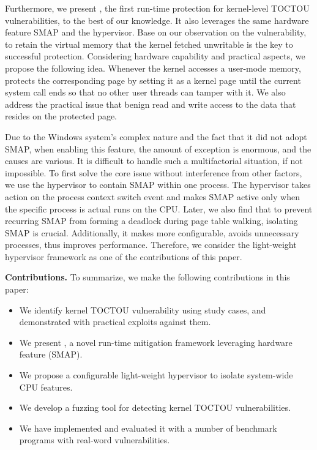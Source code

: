 Furthermore, we present \name, the first run-time protection for kernel-level TOCTOU vulnerabilities, to the best of our knowledge. It also leverages the same hardware feature SMAP and the hypervisor. Base on our observation on the vulnerability, to retain the virtual memory that the kernel fetched unwritable is the key to successful protection. Considering hardware capability and practical aspects, we propose the following idea. Whenever the kernel accesses a user-mode memory, \name protects the corresponding page by setting it as a kernel page until the current system call ends so that no other user threads can tamper with it. We also address the practical issue that benign read and write access to the data that resides on the protected page.


Due to the Windows system's complex nature and the fact that it did not adopt SMAP, when enabling this feature, the amount of exception is enormous, and the causes are various. It is difficult to handle such a multifactorial situation, if not impossible. To first solve the core issue without interference from other factors, we use the hypervisor to contain SMAP within one process. The hypervisor takes action on the process context switch event and makes SMAP active only when the specific process is actual runs on the CPU. Later, we also find that to prevent recurring SMAP from forming a deadlock during page table walking, isolating SMAP is crucial. Additionally, it makes \name more configurable, avoids unnecessary processes, thus improves performance. Therefore, we consider the light-weight hypervisor framework as one of the contributions of this paper. 

\textbf{Contributions.} To summarize, we make the following contributions in this paper:
\begin{itemize}[leftmargin=*]
    \item We identify kernel TOCTOU vulnerability using study cases, and demonstrated with practical exploits against them. 
    \item We present \name, a novel run-time mitigation framework leveraging hardware feature (SMAP). 
    \item We propose a configurable light-weight hypervisor to isolate system-wide CPU features.
    \item We develop a fuzzing tool for detecting kernel TOCTOU vulnerabilities.
    \item We have implemented \name and evaluated it with a number of benchmark programs with real-word vulnerabilities.
  
\end{itemize}


